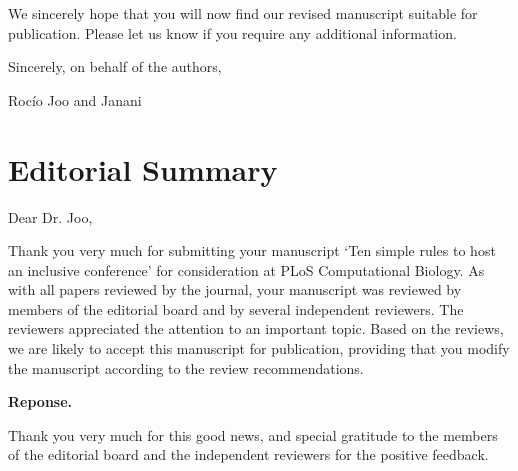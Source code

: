 \documentclass{article}
\newenvironment{Reply}{\noindent\color{BlueViolet}\textbf{Reponse.}}{\vspace{1em}}
\begin{document}
We sincerely hope that you will now find our revised manuscript suitable for publication. Please let us know if you require any additional information. 

Sincerely,
on behalf of the authors,

Roc\'io Joo and Janani


\section*{Editorial Summary} 

Dear Dr. Joo,

Thank you very much for submitting your manuscript `Ten simple rules to host an inclusive conference' for consideration at PLoS Computational Biology. As with all papers reviewed by the journal, your manuscript was reviewed by members of the editorial board and by several independent reviewers. The reviewers appreciated the attention to an important topic. Based on the reviews, we are likely to accept this manuscript for publication, providing that you modify the manuscript according to the review recommendations.

\begin{Reply}

    Thank you very much for this good news, and special gratitude to the members of the editorial board and the independent reviewers for the positive feedback.
\end{Reply}





\end{document}
